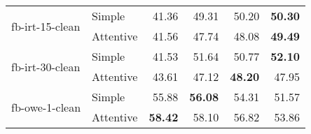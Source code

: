 \begin{tabular}{| l | l | r | r | r | r |}
    \multirow{2}{*}{fb-irt-15-clean}
    & Simple    & 41.36 & 49.31 & 50.20 & \textbf{50.30} \\
    & Attentive & 41.56 & 47.74 & 48.08 & \textbf{49.49} \\ \hline

    \multirow{2}{*}{fb-irt-30-clean}
    & Simple    & 41.53 & 51.64 & 50.77 & \textbf{52.10} \\
    & Attentive & 43.61 & 47.12 & \textbf{48.20} & 47.95 \\ \hline

    \multirow{2}{*}{fb-owe-1-clean}
    & Simple    & 55.88 & \textbf{56.08} & 54.31 & 51.57 \\
    & Attentive & \textbf{58.42} & 58.10 & 56.82 & 53.86 \\ \hline

\end{tabular}
